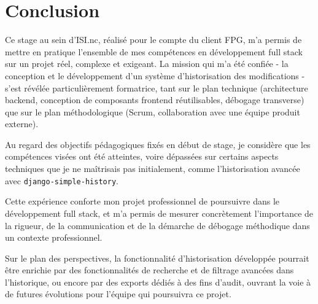 
\chapter*{Conclusion}

Ce stage au sein d'ISI.nc, réalisé pour le compte du client FPG, m'a
permis de mettre en pratique l'ensemble de mes compétences en
développement full stack sur un projet réel, complexe et exigeant. La
mission qui m'a été confiée  -  la conception et le développement d'un
système d'historisation des modifications  -  s'est révélée
particulièrement formatrice, tant sur le plan technique (architecture
backend, conception de composants frontend réutilisables, débogage
transverse) que sur le plan méthodologique (Scrum, collaboration avec une
équipe produit externe).

Au regard des objectifs pédagogiques fixés en début de stage, je considère
que les compétences visées ont été atteintes, voire dépassées sur
certains aspects techniques que je ne maîtrisais pas initialement, comme
l'historisation avancée avec \texttt{django-simple-history}.

Cette expérience conforte mon projet professionnel de poursuivre dans le
développement full stack, et m'a permis de mesurer concrètement
l'importance de la rigueur, de la communication et de la démarche de
débogage méthodique dans un contexte professionnel.

Sur le plan des perspectives, la fonctionnalité d'historisation
développée pourrait être enrichie par des fonctionnalités de recherche
et de filtrage avancées dans l'historique, ou encore par des exports
dédiés à des fins d'audit, ouvrant la voie à de futures évolutions pour
l'équipe qui poursuivra ce projet.

\newpage
